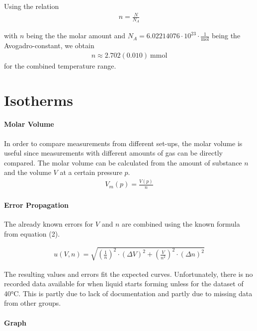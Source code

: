 \documentclass[10pt,a4paper]{article}
\begin{document}
\bigskip

Using the relation
\begin{align}
n = \frac{N}{N_A}
\end{align}

with $n$ being the the molar amount and $N_A = 6.02214076 \cdot 10^{23} \cdot \frac{1}{\textrm{mol}} $ being the Avogadro-constant, we obtain
\begin{align}
n \approx 2.702 (0.010) \ \textrm{mmol}
\end{align}
for the combined temperature range.

\section{Isotherms}
\medskip

\paragraph{Molar Volume}

In order to compare measurements from different set-ups, the molar volume is useful since measurements with different amounts of gas can be directly compared.
The molar volume can be calculated from the amount of substance $n$ and the volume $V$ at a certain pressure $p$.
\begin{align}
V_m(p) = \frac{V(p)}{n}
\end{align}

\paragraph{Error Propagation}

The already known errors for $V$ and $n$ are combined using the known formula from equation (2).

\begin{align}
u(V, n) = \sqrt{(\frac{1}{n})^2\cdot (\Delta V)^2 + (\frac{V}{n^2})^2 \cdot (\Delta n)^2 }
\end{align}

The resulting values and errors fit the expected curves. Unfortunately, there is no recorded data available for when liquid starts forming unless for the dataset of 40°C. This is partly due to lack of documentation and partly due to missing data from other groups.

\paragraph{Graph}
\end{document}
